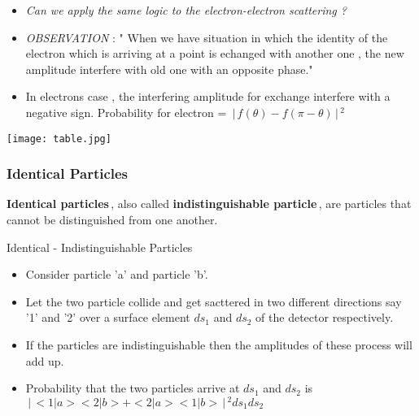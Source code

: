 \documentclass[aspectratio=169]{beamer}
\begin{document}
\begin{frame}
	
	\begin{itemize}
		\item \textit{Can we apply the same logic to the electron-electron scattering ? }\newline
		\item \textit{OBSERVATION} : " When we have situation in which the identity of the electron which is arriving at a point is echanged with another one , the new amplitude interfere with old one with an opposite phase." \newline
		\item In electrons case , the interfering amplitude for exchange interfere with a negative sign. \newline
		Probability for electron = $\,\Bigr\rvert\,f(\theta)-f(\pi-\theta)\,\Bigr\rvert\,^{2}$
		 \end{itemize}
\end{frame}

\begin{frame}
 	\center \texttt{[image: table.jpg]}
	
\end{frame}

\begin{frame}
	\frametitle{Identical Particles}
	
		{\large \textbf{Identical particles}\,, also called \textbf{indistinguishable particle}\,, are particles that cannot be distinguished from one another.}
		
\end{frame}

\begin{frame}{Identical - Indistinguishable Particles}
	\begin{itemize}
		\item Consider particle 'a' and particle 'b'. \newline
		\item Let the two particle collide and get sacttered in two different directions say '1' and '2' over a surface element $ds_{1}$ and $ds_{2}$ of the detector respectively. \newline
		\item If the particles are indistinguishable then the amplitudes of these process will add up. \newline
		\item Probability that the two particles arrive at $ds_{1}$ and $ds_{2}$ is \newline
		$\,\Bigr\rvert\,<1|a><2|b> + <2|a><1|b>\,\Bigr\rvert\,^{2} ds_{1} ds_{2}$
		
	\end{itemize}
\end{frame}
\end{document}
